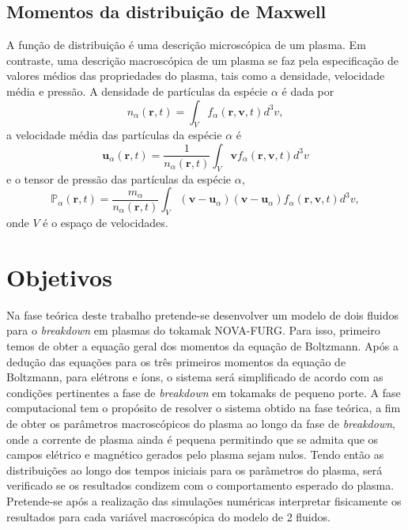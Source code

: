 \documentclass[12pt,oneside,a4paper]{abntex2}
\begin{document}
\section{Momentos da distribuição de Maxwell}
\noindent A função de distribuição é uma descrição microscópica de um plasma. Em contraste, uma descrição macroscópica de um plasma se faz pela especificação de valores médios das propriedades do plasma, tais como a densidade, velocidade média e pressão. A densidade de partículas da espécie $\alpha$ é dada por
\begin{equation*}
    n_\alpha(\bm{r},t) = \int_V f_\alpha(\bm{r},\bm{v},t) d^3 v,
\end{equation*}
a velocidade média das partículas da espécie $\alpha$ é
\begin{equation*}
    \bm{u}_\alpha(\bm{r},t) = \frac{1}{n_\alpha(\bm{r},t)} \int_V \bm{v} f_\alpha(\bm{r},\bm{v},t) d^3 v
\end{equation*}
e o tensor de pressão das partículas da espécie $\alpha$,
\begin{equation*}
    \mathbb{P}_\alpha(\bm{r},t) = \frac{m_\alpha}{n_\alpha(\bm{r},t)}\int_V (\bm{v}-\bm{u}_\alpha)(\bm{v}-\bm{u}_\alpha) f_\alpha(\bm{r},\bm{v},t) d^3 v,
\end{equation*}
onde $V$ é o espaço de velocidades.

\chapter{Objetivos}
\noindent Na fase teórica deste trabalho pretende-se desenvolver um modelo de dois fluidos para o \textit{breakdown} em plasmas do tokamak NOVA-FURG. Para isso, primeiro temos de obter a equação geral dos momentos da equação de Boltzmann.
Após a dedução das equações para os três primeiros momentos da equação de Boltzmann, para elétrons e íons, o sistema será simplificado de acordo com as condições pertinentes a fase de \textit{breakdown} em tokamaks de pequeno porte. 
A fase computacional tem o propósito de resolver o sistema obtido na fase teórica, a fim de obter os parâmetros macroscópicos do plasma ao longo da fase de \textit{breakdown}, onde a corrente de plasma ainda é pequena permitindo que se admita que os campos elétrico e magnético gerados pelo plasma sejam nulos. 
Tendo então as distribuições ao longo dos tempos iniciais para os parâmetros do plasma, será verificado se os resultados condizem com o comportamento esperado do plasma.
Pretende-se após a realização das simulações numéricas interpretar fisicamente os resultados para cada variável macroscópica do modelo de 2 fluidos.  
\end{document}
